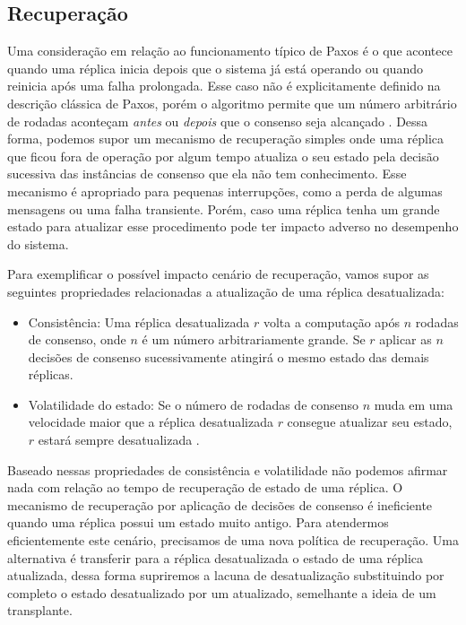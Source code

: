 \subsection{Recuperação}

Uma consideração em relação ao funcionamento típico de Paxos é o que acontece
quando uma réplica inicia depois que o sistema já está operando ou quando reinicia após
uma falha prolongada. Esse caso não é explicitamente definido na descrição clássica de
Paxos, porém o algoritmo permite que um número arbitrário de rodadas aconteçam
\emph{antes} ou \emph{depois} que o consenso seja alcançado \cite{lamport98}. Dessa forma,
podemos supor um mecanismo de recuperação simples onde uma réplica que ficou fora de
operação por algum tempo atualiza o seu estado pela decisão sucessiva das instâncias de
consenso que ela não tem conhecimento. Esse mecanismo é apropriado para pequenas
interrupções, como a perda de algumas mensagens ou uma falha transiente. Porém, caso uma
réplica tenha um grande estado para atualizar esse procedimento pode ter impacto adverso
no desempenho do sistema.

Para exemplificar o possível impacto cenário de recuperação, vamos supor as seguintes
propriedades relacionadas a atualização de uma réplica desatualizada:

\begin{itemize}
  \item Consistência: Uma réplica desatualizada $r$ volta a computação após $n$ rodadas de
    consenso, onde $n$ é um número arbitrariamente grande. Se $r$ aplicar as $n$ decisões
    de consenso sucessivamente atingirá o mesmo estado das demais réplicas.
  \item Volatilidade do estado: Se o número de rodadas de consenso $n$ muda em uma
    velocidade maior que a réplica desatualizada $r$ consegue atualizar seu estado, $r$
    estará sempre desatualizada \cite{vilaca09}.
\end{itemize}

Baseado nessas propriedades de consistência e volatilidade não podemos afirmar nada com
relação ao tempo de recuperação de estado de uma réplica. O mecanismo de recuperação por
aplicação de decisões de consenso é ineficiente quando uma réplica possui um estado muito
antigo. Para atendermos eficientemente este cenário, precisamos de uma nova política de
recuperação. Uma alternativa é transferir para a réplica desatualizada o estado de uma
réplica atualizada, dessa forma supriremos a lacuna de desatualização substituindo por
completo o estado desatualizado por um atualizado, semelhante a ideia de um transplante.

